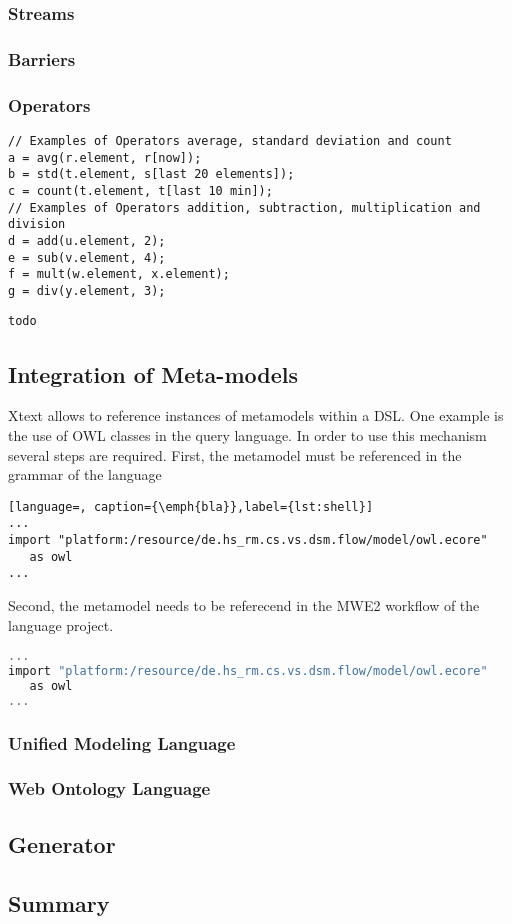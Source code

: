 \subsubsection{Streams}
\subsubsection{Barriers}
\subsubsection{Operators}

\begin{lstlisting}[language=Flow, caption={\emph{Examples of Analysis Operators in Flow}},label={lst:exanflw}]
// Examples of Operators average, standard deviation and count
a = avg(r.element, r[now]);
b = std(t.element, s[last 20 elements]);
c = count(t.element, t[last 10 min]);
// Examples of Operators addition, subtraction, multiplication and division
d = add(u.element, 2);
e = sub(v.element, 4);
f = mult(w.element, x.element);
g = div(y.element, 3);
\end{lstlisting}

\begin{lstlisting}[language=Flow, caption={\emph{Examples of Analysis Operators in LUA}},label={lst:exanlua}]
todo
\end{lstlisting}


\subsection{Integration of Meta-models}
Xtext allows to reference instances of metamodels within a DSL. One example is 
the use of OWL classes in the query language. In order to use this mechanism 
several steps are required. First, the metamodel must be referenced in the 
grammar of the language
\begin{lstlisting}[language=, caption={\emph{bla}},label={lst:shell}]
...
import "platform:/resource/de.hs_rm.cs.vs.dsm.flow/model/owl.ecore"
   as owl
...
\end{lstlisting}
Second, the metamodel needs to be referecend in the MWE2 workflow of the 
language project.
\begin{lstlisting}[language=C, caption={\emph{bla}},label={lst:shell}]
...
import "platform:/resource/de.hs_rm.cs.vs.dsm.flow/model/owl.ecore"
   as owl
...
\end{lstlisting}

\subsubsection{Unified Modeling Language}
\subsubsection{Web Ontology Language}
\subsection{Generator}
\subsection{Summary}
